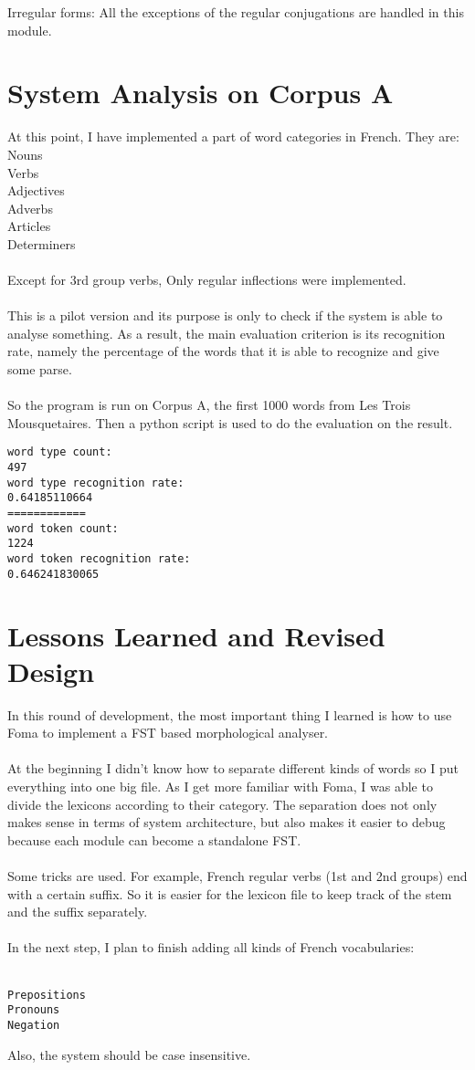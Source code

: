 \documentclass[11pt,letterpaper]{article}
\begin{document}
\indent Irregular forms: All the exceptions of the regular conjugations are handled in this module.\\
\section{System Analysis on Corpus A}
At this point, I have implemented a part of word categories in French. They are:\\
\indent Nouns\\
\indent Verbs\\
\indent Adjectives\\
\indent Adverbs\\
\indent Articles\\
\indent Determiners\\
\\
Except for 3rd group verbs, Only regular inflections were implemented.\\
\\
This is a pilot version and its purpose is only to check if the system is able to analyse something. As a result, the main evaluation criterion is its recognition rate, namely the percentage of the words that it is able to recognize and give some parse.\\
\\
So the program is run on Corpus A, the first 1000 words from Les Trois Mousquetaires. Then a python script is used to do the evaluation on the result.
\\
\begin{verbatim}
word type count:
497
word type recognition rate:
0.64185110664
============
word token count:
1224
word token recognition rate:
0.646241830065
\end{verbatim}

\section{Lessons Learned and Revised Design}
In this round of development, the most important thing I learned is how to use Foma to implement a FST based morphological analyser. \\
\\
At the beginning I didn't know how to separate different kinds of words so I put everything into one big file. As I get more familiar with Foma, I was able to divide the lexicons according to their category. The separation does not only makes sense in terms of system architecture, but also makes it easier to debug because each module can become a standalone FST.\\
\\
Some tricks are used. For example, French regular verbs (1st and 2nd groups) end with a certain suffix. So it is easier for the lexicon file to keep track of the stem and the suffix separately.\\
\\
In the next step, I plan to finish adding all kinds of French vocabularies:\\
\\
\begin{verbatim}
Prepositions
Pronouns
Negation
\end{verbatim}
Also, the system should be case insensitive.\\
\end{document}
